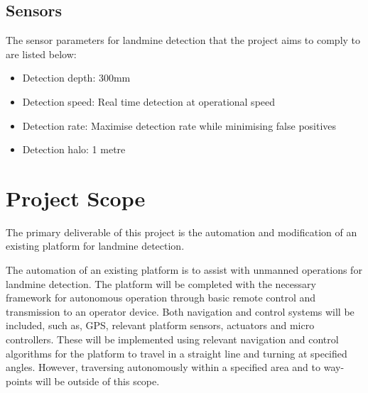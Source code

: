\documentclass[main.tex]{subfiles}
\begin{document}
\subsection{Sensors}
The sensor parameters for landmine detection that the project aims to comply to are listed below:
\begin{itemize}
\item Detection depth: 300mm 
\item Detection speed: Real time detection at operational speed
\item Detection rate: Maximise detection rate while minimising false positives
\item Detection halo: 1 metre
\end{itemize}

\section{Project Scope}

The primary deliverable of this project is the automation and modification of an existing platform for landmine detection. %

The automation of an existing platform is to assist with unmanned operations for landmine detection. The platform will be completed with the necessary framework for autonomous operation through basic remote control and transmission to an operator device. Both navigation and control systems will be included, such as, GPS, relevant platform sensors, actuators and micro controllers. These will be implemented using relevant navigation and control algorithms for the platform to travel in a straight line and turning at specified angles. However, traversing autonomously within a specified area and to way-points will be outside of this scope. 
\end{document}
